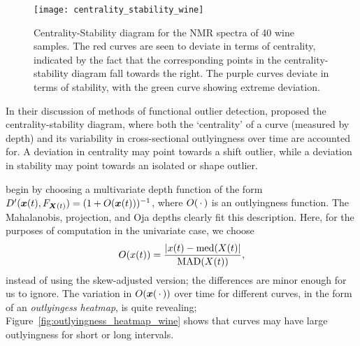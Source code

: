 \begin{figure}
    \centering
    \texttt{[image: centrality\_stability\_wine]}
    \caption{
        Centrality-Stability diagram for the NMR spectra of 40 wine samples.
        The red curves are seen to deviate in terms of centrality, indicated
        by the fact that the corresponding points in the centrality-stability
        diagram fall towards the right.
        The purple curves deviate in terms of stability, with the green curve
        showing extreme deviation.
    }
    \label{fig:centrality_stability_wine}
\end{figure}

In their discussion of methods of functional outlier detection,
\textcite{hubert-rousseeuw-segeart-2015} proposed the centrality-stability
diagram, where both the `centrality' of a curve (measured by depth) and its
variability in cross-sectional outlyingness over time are accounted for.
A deviation in centrality may point towards a shift outlier, while a deviation
in stability may point towards an isolated or shape outlier.

\textcite{hubert-rousseeuw-segeart-2015} begin by choosing a multivariate
depth function of the form $D'(\bm{x}(t), F_{\bm{X}(t)}) = (1 + O(\bm{x}(t)))^{-1}$,
where $O(\,\cdot\,)$ is an outlyingness function.
The Mahalanobis, projection, and Oja depths clearly fit this description.
Here, for the purposes of computation in the univariate case, we choose
\begin{equation}
    O(x(t)) = \frac{|x(t) - \operatorname{med}(X(t)|}{\operatorname{MAD}(X(t))},
\end{equation}
instead of using the skew-adjusted version; the differences are minor enough
for us to ignore.
The variation in $O(\bm{x}(\,\cdot\,))$ over time for different curves, in the form
of an \emph{outlyingess heatmap}, is quite revealing;
Figure~\ref{fig:outlyingness_heatmap_wine} shows that curves may have large
outlyingness for short or long intervals.

